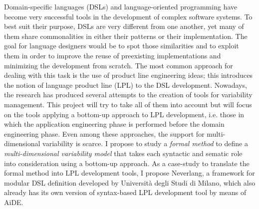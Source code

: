 Domain-specific languages (DSLs) and language-oriented programming have become very successful tools in the development of complex software systems. To best suit their purpose, DSLs are very different from one another, yet many of them share commonalities in either their patterns or their implementation. The goal for language designers would be to spot those similarities and to exploit them in order to improve the reuse of preexisting implementations and minimizing the development from scratch. The most common approach for dealing with this task is the use of product line engineering ideas; this introduces the notion of language product line (LPL) to the DSL development. Nowadays, the research has produced several attempts to the creation of tools for variability management. This project will try to take all of them into account but will focus on the tools applying a bottom-up approach to LPL development, i.e. those in which the application engineering phase is performed before the domain engineering phase. Even among these approaches, the support for multi-dimensional variability is scarce. I propose to study a \textit{formal method} to define a \textit{multi-dimensional variability model} that takes each syntactic and sematic role into consideration using a bottom-up approach. As a case-study to translate the formal method into LPL development tools, I propose Neverlang, a framework for modular DSL definition developed by Università degli Studi di Milano, which also already has its own version of syntax-based LPL development tool by means of AiDE.  
